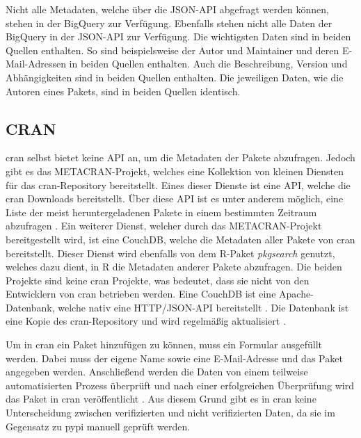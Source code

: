 Nicht alle Metadaten, welche über die JSON-API abgefragt werden können, stehen in der BigQuery zur Verfügung.
Ebenfalls stehen nicht alle Daten der BigQuery in der JSON-API zur Verfügung.
Die wichtigsten Daten sind in beiden Quellen enthalten.
So sind beispielsweise der Autor und Maintainer und deren E-Mail-Adressen in beiden Quellen enthalten.
Auch die Beschreibung, Version und Abhängigkeiten sind in beiden Quellen enthalten.
Die jeweiligen Daten, wie die Autoren eines Pakets, sind in beiden Quellen identisch.

\subsection{CRAN}
\label{subsec:paketverwaltung_cran}
\gls{cran} selbst bietet keine API an, um die Metadaten der Pakete abzufragen.
Jedoch gibt es das METACRAN-Projekt, welches eine Kollektion von kleinen Diensten für das \gls{cran}-Repository bereitstellt.
Eines dieser Dienste ist eine API, welche die \gls{cran} Downloads bereitstellt.
Über diese API ist es unter anderem möglich, eine Liste der meist heruntergeladenen Pakete in einem bestimmten Zeitraum abzufragen \autocite{csardi_r-hubcranlogsapp_2024}.
Ein weiterer Dienst, welcher durch das METACRAN-Projekt bereitgestellt wird, ist eine CouchDB, welche die Metadaten aller Pakete von \gls{cran} bereitstellt.
Dieser Dienst wird ebenfalls von dem R-Paket \emph{pkgsearch} genutzt, welches dazu dient, in R die Metadaten anderer Pakete abzufragen.
Die beiden Projekte sind keine \gls{cran} Projekte, was bedeutet, dass sie nicht von den Entwicklern von \gls{cran} betrieben werden.
Eine CouchDB ist eine Apache-Datenbank, welche nativ eine HTTP/JSON-API bereitstellt \autocite{the_apache_software_foundation_apache_2024}.
Die Datenbank ist eine Kopie des \gls{cran}-Repository und wird regelmäßig aktualisiert \autocite{csardi_pkgsearch_2023}.

Um in \gls{cran} ein Paket hinzufügen zu können, muss ein Formular ausgefüllt werden.
Dabei muss der eigene Name sowie eine E-Mail-Adresse und das Paket angegeben werden.
Anschließend werden die Daten von einem teilweise automatisierten Prozess überprüft und nach einer erfolgreichen Überprüfung wird das Paket in \gls{cran} veröffentlicht \autocite{altmann_comprehensive_2024}.
Aus diesem Grund gibt es in \gls{cran} keine Unterscheidung zwischen verifizierten und nicht verifizierten Daten, da sie im Gegensatz zu \gls{pypi} manuell geprüft werden.

